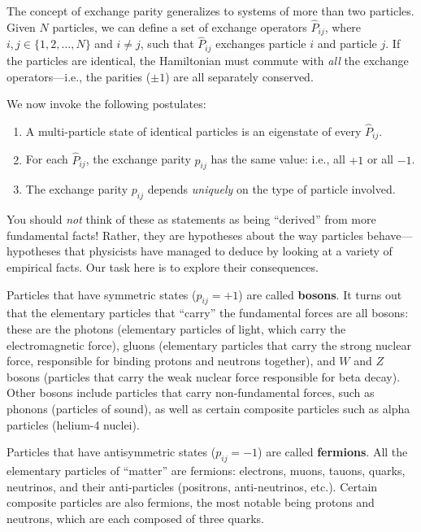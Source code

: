 \documentclass[pra,12pt]{revtex4}
\begin{document}
The concept of exchange parity generalizes to systems of more than two
particles.  Given $N$ particles, we can define a set of exchange
operators $\hat{P}_{ij}$, where $i,j\in\{1,2,\dots,N\}$ and $i\ne j$,
such that $\hat{P}_{ij}$ exchanges particle $i$ and particle $j$.  If
the particles are identical, the Hamiltonian must commute with
\textit{all} the exchange operators---i.e., the parities ($\pm 1$) are
all separately conserved.

We now invoke the following postulates:
\begin{enumerate}
\item A multi-particle state of identical particles is an eigenstate
  of every $\hat{P}_{ij}$.

\item For each $\hat{P}_{ij}$, the exchange parity $p_{ij}$ has the
  same value: i.e., all $+1$ or all $-1$.

\item The exchange parity $p_{ij}$ depends \textit{uniquely} on the
  type of particle involved.
\end{enumerate}
You should \textit{not} think of these as statements as being
``derived'' from more fundamental facts!  Rather, they are hypotheses
about the way particles behave---hypotheses that physicists have
managed to deduce by looking at a variety of empirical facts.  Our
task here is to explore their consequences.

Particles that have symmetric states ($p_{ij} = +1$) are called
\textbf{bosons}.  It turns out that the elementary particles that
``carry'' the fundamental forces are all bosons: these are the photons
(elementary particles of light, which carry the electromagnetic
force), gluons (elementary particles that carry the strong nuclear
force, responsible for binding protons and neutrons together), and $W$
and $Z$ bosons (particles that carry the weak nuclear force
responsible for beta decay).  Other bosons include particles that
carry non-fundamental forces, such as phonons (particles of sound), as
well as certain composite particles such as alpha particles (helium-4
nuclei).

Particles that have antisymmetric states ($p_{ij} = -1$) are called
\textbf{fermions}.  All the elementary particles of ``matter'' are
fermions: electrons, muons, tauons, quarks, neutrinos, and their
anti-particles (positrons, anti-neutrinos, etc.).  Certain composite
particles are also fermions, the most notable being protons and
neutrons, which are each composed of three quarks.
\end{document}
